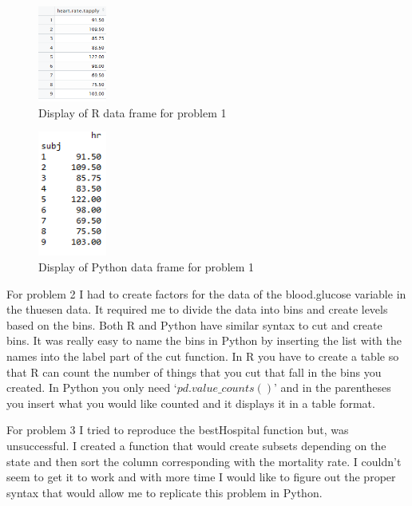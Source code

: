 \documentclass{article}
\begin{document}
\begin{figure}[h]
\begin{center}
\includegraphics[width=0.2\textwidth]{displayP1R.png}
\end{center}
\caption{Display of R data frame for problem 1}
\end{figure}


\begin{figure}[h]
\begin{center}
\includegraphics[width=0.2\textwidth]{displayP1Python.png}
\end{center}
\caption{Display of Python data frame for problem 1}
\end{figure}

\newpage
\indent For problem 2 I had to create factors for the data of the blood.glucose variable in the thuesen data. It required me to divide the data into bins and create levels based on the bins. Both R and Python have similar syntax to cut and create bins. It was really easy to name the bins in Python by inserting the list with the names into the label part of the cut function. In R you have to create a table so that R can count the number of things that you cut that fall in the bins you created. In Python you only need `$pd.value\_counts()$' and in the parentheses you insert what you would like counted and it displays it in a table format. 

\indent For problem 3 I tried to reproduce the bestHospital function but, was unsuccessful. I created a function that would create subsets depending on the state and then sort the column corresponding with the mortality rate. I couldn't seem to get it to work and with more time I would like to figure out the proper syntax that would allow me to replicate this problem in Python. 
\end{document}
